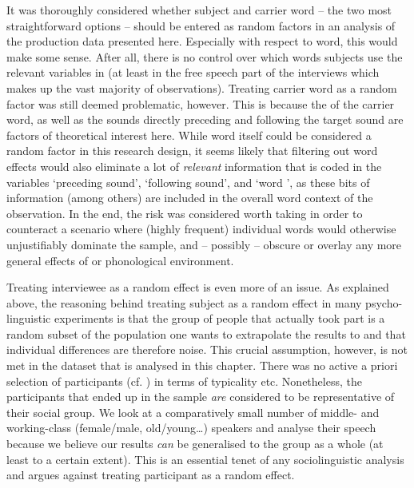 It was thoroughly considered whether subject and carrier word -- the two most straightforward options -- should be entered as random factors in an analysis of the production data presented here.
Especially with respect to word, this would make some sense.
After all, there is no control over which words subjects use the relevant variables in (at least in the free speech part of the interviews which makes up the vast majority of observations).
Treating carrier word as a random factor was still deemed problematic, however.
This is because the  of the carrier word, as well as the sounds directly preceding and following the target sound are factors of theoretical interest here.
While word itself could be considered a random factor in this research design, it seems likely that filtering out word effects would also eliminate a lot of \emph{relevant} information that is coded in the variables `preceding sound', `following sound', and `word ', as these bits of information (among others) are included in the overall word context of the observation.
In the end, the risk was considered worth taking in order to counteract a scenario where (highly frequent) individual words would otherwise unjustifiably dominate the sample, and -- possibly -- obscure or overlay any more general effects of  or phonological environment.

Treating interviewee as a random effect is even more of an issue.
As explained above, the reasoning behind treating subject as a random effect in many psycho-linguistic experiments is that the group of people that actually took part is a random subset of the population one wants to extrapolate the results to and that individual differences are therefore noise.
This crucial assumption, however, is not met in the dataset that is analysed in this chapter.
There was no active a priori selection of participants (cf. ) in terms of typicality etc.
Nonetheless, the participants that ended up in the sample \emph{are} considered to be representative of their social group.
We look at a comparatively small number of middle- and working-class (female/male, old/young\ldots) speakers and analyse their speech because we believe our results \emph{can} be generalised to the group as a whole (at least to a certain extent).
This is an essential tenet of any sociolinguistic analysis and argues against treating participant as a random effect.

